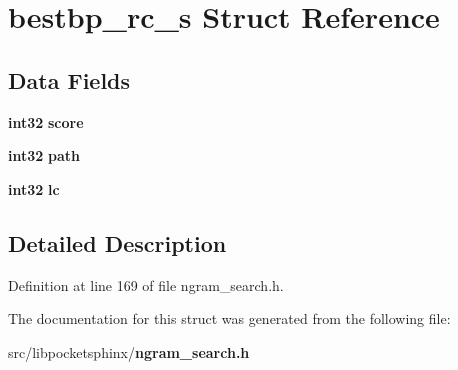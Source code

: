 \section{bestbp\-\_\-rc\-\_\-s \-Struct \-Reference}
\label{structbestbp__rc__s}
\subsection*{\-Data \-Fields}
\begin{DoxyCompactItemize}
\item 
{\bf int32} {\bfseries score}\label{structbestbp__rc__s_a22fb17e130599acbde1fac4debcca469}

\item 
{\bf int32} {\bfseries path}\label{structbestbp__rc__s_a3cc3a67aa32da9669c5305f7ebb2e7ce}

\item 
{\bf int32} {\bfseries lc}\label{structbestbp__rc__s_a33fd8891076deb0d592e038cddca66a4}

\end{DoxyCompactItemize}


\subsection{\-Detailed \-Description}


\-Definition at line 169 of file ngram\-\_\-search.\-h.



\-The documentation for this struct was generated from the following file\-:\begin{DoxyCompactItemize}
\item 
src/libpocketsphinx/{\bf ngram\-\_\-search.\-h}\end{DoxyCompactItemize}

